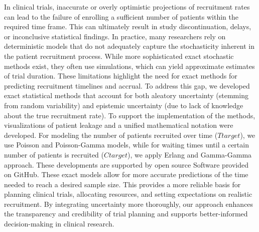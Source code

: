 \documentclass[11pt,a4paper,twoside]{book}
\begin{document}
\noindent
In clinical trials, inaccurate or overly optimistic projections of recruitment rates can lead to the failure of enrolling a sufficient number of patients within the required time frame. This can ultimately result in study discontinuation, delays, or inconclusive statistical findings. In practice, many researchers rely on deterministic models that do not adequately capture the stochasticity inherent in the patient recruitment process. While more sophisticated exact stochastic methods exist, they often use simulations, which can yield approximate estimates of trial duration. These limitations highlight the need for exact methods for predicting recruitment timelines and accrual. To address this gap, we developed exact statistical methods that account for both aleatory uncertainty (stemming from random variability) and epistemic uncertainty (due to lack of knowledge about the true recruitment rate). To support the implementation of the methods, visualizations of patient leakage and a unified mathematical notation were developed. For modeling the number of patients recruited over time  ($Ttarget$), we use Poisson and Poisson-Gamma models, while for waiting times until a certain number of patients is recruited ($Ctarget$), we apply Erlang and Gamma-Gamma approach. These developments are supported by open source Software provided on GitHub. These exact models allow for more accurate predictions of the time needed to reach a desired sample size. This provides a more reliable basis for planning clinical trials, allocating resources, and setting expectations on realistic recruitment. By integrating uncertainty more thoroughly, our approach enhances the transparency and credibility of trial planning and supports better-informed decision-making in clinical research.

\vspace{2em}  %








\end{document}
